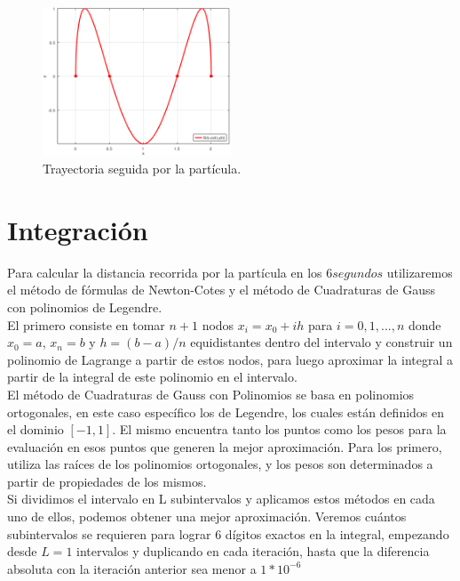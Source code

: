 \documentclass{article}
\begin{document}
    \begin{figure}[h]
        \centering
        \includegraphics[width=0.5\textwidth]{fig3}
        \caption{Trayectoria seguida por la partícula.}
        \label{fig2}
    \end{figure}
    
    \section{Integración}
    Para calcular la distancia recorrida por la partícula en los \(6 segundos\) utilizaremos el método de fórmulas de Newton-Cotes y el método de Cuadraturas de Gauss con polinomios de Legendre.\\
    \indent El primero consiste en tomar \(n+1\) nodos \(x_i=x_0+ih\) para \(i=0,1,...,n\) donde \(x_0=a\), \(x_n=b\) y \(h=(b-a)/n\) equidistantes dentro del intervalo y construir un polinomio de Lagrange a partir de estos nodos, para luego aproximar la integral a partir de la integral de este polinomio en el intervalo.\\
    \indent El método de Cuadraturas de Gauss con Polinomios se basa en polinomios ortogonales, en este caso específico los de Legendre, los cuales están definidos en el dominio \([-1,1]\). El mismo encuentra tanto los puntos como los pesos para la evaluación en esos puntos que generen la mejor aproximación. Para los primero, utiliza las raíces de los polinomios ortogonales, y los pesos son determinados a partir de propiedades de los mismos.\\
    \indent Si dividimos el intervalo en L subintervalos y aplicamos estos métodos en cada uno de ellos, podemos obtener una mejor aproximación. Veremos cuántos subintervalos se requieren para lograr 6 dígitos exactos en la integral, empezando desde \(L=1\) intervalos y duplicando en cada iteración, hasta que la diferencia absoluta con la iteración anterior sea menor a \(1*10^{-6}\)\\\\\\\\
\end{document}

